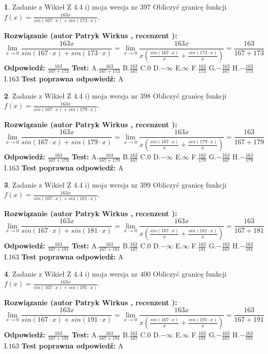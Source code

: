 \documentclass[12pt, a4paper]{article}
\theoremstyle{definition} %
\newtheorem{zad}{}
\newcommand{\zadStart}[1]{\begin{zad}#1\newline}
\newcommand{\zadStop}{\end{zad}}
\newcommand{\rozwStart}[2]{\noindent \textbf{Rozwiązanie (autor #1 , recenzent #2): }\newline}
\newcommand{\rozwStop}{\newline}
\newcommand{\odpStart}{\noindent \textbf{Odpowiedź:}\newline}
\newcommand{\odpStop}{\newline}
\newcommand{\testStart}{\noindent \textbf{Test:}\newline}
\newcommand{\testStop}{\newline}
\newcommand{\kluczStart}{\noindent \textbf{Test poprawna odpowiedź:}\newline}
\newcommand{\kluczStop}{\newline}
\begin{document}
\zadStart{Zadanie z Wikieł Z 4.4 i) moja wersja nr 397}
Obliczyć granicę funkcji $f(x)=\frac{163x}{sin(167\cdot x) +sin(173\cdot x)}$.
\zadStop
\rozwStart{Patryk Wirkus}{}
$$\lim\limits_{x\to 0}\frac{163x}{sin(167\cdot x) +sin(173\cdot x)}=\lim\limits_{x\to 0}\frac{163x}{x(\frac{sin(167\cdot x)}{x}+\frac{sin(173\cdot x)}{x})}=\frac{163}{167+173}$$
\rozwStop
\odpStart
$\frac{163}{167+173}$
\odpStop
\testStart
A.$\frac{163}{167+173}$
B.$\frac{163}{167}$
C.$0$
D.$-\infty$
E.$\infty$
F.$\frac{163}{173}$
G.$-\frac{163}{167}$
H.$-\frac{163}{173}$
I.$163$
\testStop
\kluczStart
A
\kluczStop



\zadStart{Zadanie z Wikieł Z 4.4 i) moja wersja nr 398}
Obliczyć granicę funkcji $f(x)=\frac{163x}{sin(167\cdot x) +sin(179\cdot x)}$.
\zadStop
\rozwStart{Patryk Wirkus}{}
$$\lim\limits_{x\to 0}\frac{163x}{sin(167\cdot x) +sin(179\cdot x)}=\lim\limits_{x\to 0}\frac{163x}{x(\frac{sin(167\cdot x)}{x}+\frac{sin(179\cdot x)}{x})}=\frac{163}{167+179}$$
\rozwStop
\odpStart
$\frac{163}{167+179}$
\odpStop
\testStart
A.$\frac{163}{167+179}$
B.$\frac{163}{167}$
C.$0$
D.$-\infty$
E.$\infty$
F.$\frac{163}{179}$
G.$-\frac{163}{167}$
H.$-\frac{163}{179}$
I.$163$
\testStop
\kluczStart
A
\kluczStop



\zadStart{Zadanie z Wikieł Z 4.4 i) moja wersja nr 399}
Obliczyć granicę funkcji $f(x)=\frac{163x}{sin(167\cdot x) +sin(181\cdot x)}$.
\zadStop
\rozwStart{Patryk Wirkus}{}
$$\lim\limits_{x\to 0}\frac{163x}{sin(167\cdot x) +sin(181\cdot x)}=\lim\limits_{x\to 0}\frac{163x}{x(\frac{sin(167\cdot x)}{x}+\frac{sin(181\cdot x)}{x})}=\frac{163}{167+181}$$
\rozwStop
\odpStart
$\frac{163}{167+181}$
\odpStop
\testStart
A.$\frac{163}{167+181}$
B.$\frac{163}{167}$
C.$0$
D.$-\infty$
E.$\infty$
F.$\frac{163}{181}$
G.$-\frac{163}{167}$
H.$-\frac{163}{181}$
I.$163$
\testStop
\kluczStart
A
\kluczStop



\zadStart{Zadanie z Wikieł Z 4.4 i) moja wersja nr 400}
Obliczyć granicę funkcji $f(x)=\frac{163x}{sin(167\cdot x) +sin(191\cdot x)}$.
\zadStop
\rozwStart{Patryk Wirkus}{}
$$\lim\limits_{x\to 0}\frac{163x}{sin(167\cdot x) +sin(191\cdot x)}=\lim\limits_{x\to 0}\frac{163x}{x(\frac{sin(167\cdot x)}{x}+\frac{sin(191\cdot x)}{x})}=\frac{163}{167+191}$$
\rozwStop
\odpStart
$\frac{163}{167+191}$
\odpStop
\testStart
A.$\frac{163}{167+191}$
B.$\frac{163}{167}$
C.$0$
D.$-\infty$
E.$\infty$
F.$\frac{163}{191}$
G.$-\frac{163}{167}$
H.$-\frac{163}{191}$
I.$163$
\testStop
\kluczStart
A
\kluczStop
\end{document}
